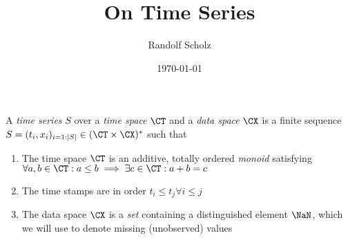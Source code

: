 \documentclass[a4paper,11pt,reqno]{scrartcl}
\date{\today}
\author{Randolf Scholz}
\title{On Time Series}
\begin{document}
\maketitle

%
\begin{definition}\label{def: time series}
  A \emph{time series} $S$ over a \emph{time space} $\CT$ and a \emph{data space} $\CX$ is a finite sequence $S=(t_i, x_i)_{i=1:|S|}\in(\CT\times\CX)^*$ such that

\begin{enumerate}%
  \item The time space $\CT$ is an additive, totally ordered \emph{monoid} satisfying $\forall a,b\in \CT: a\le b\implies \exists c\in\CT: a+b=c$
  \item The time stamps are in order $t_i \le t_j \forall i\le j$
  \item The data space $\CX$ is a \emph{set} containing a distinguished element $\NaN$, which we will use to denote missing (unobserved) values
\end{enumerate}%
%
\end{definition}
\end{document}
